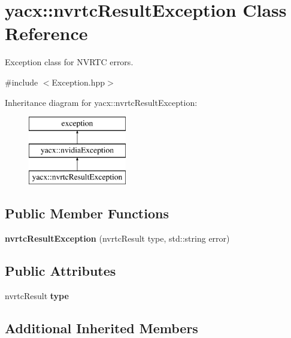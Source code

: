 \hypertarget{classyacx_1_1nvrtc_result_exception}{}\section{yacx\+:\+:nvrtc\+Result\+Exception Class Reference}
\label{classyacx_1_1nvrtc_result_exception}


Exception class for N\+V\+R\+TC errors.  




{\ttfamily \#include $<$Exception.\+hpp$>$}

Inheritance diagram for yacx\+:\+:nvrtc\+Result\+Exception\+:\begin{figure}[H]
\begin{center}
\leavevmode
\includegraphics[height=3.000000cm]{classyacx_1_1nvrtc_result_exception}
\end{center}
\end{figure}
\subsection*{Public Member Functions}
\begin{DoxyCompactItemize}
\item 
\mbox{\label{classyacx_1_1nvrtc_result_exception_ae054b99ae7de3bb3d2e3b3829a620f6b}} 
{\bfseries nvrtc\+Result\+Exception} (nvrtc\+Result type, std\+::string error)
\end{DoxyCompactItemize}
\subsection*{Public Attributes}
\begin{DoxyCompactItemize}
\item 
\mbox{\label{classyacx_1_1nvrtc_result_exception_a613f542dabe2270f6731ff6babfed47e}} 
nvrtc\+Result {\bfseries type}
\end{DoxyCompactItemize}
\subsection*{Additional Inherited Members}



